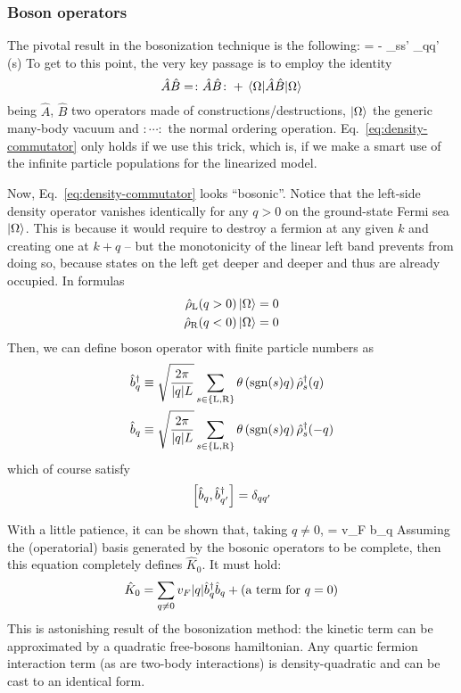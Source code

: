 \subsubsection*{Boson operators}

The pivotal result in the bosonization technique is the following:
\beq\label{eq:density-commutator}
	 = - \delta_{ss'} \delta_{qq'} \sgn(s) 
\eeq
To get to this point, the very key passage is to employ the identity
\[
	\hat A \hat B = \colon \hat A \hat B \colon + \mel{\Omega}{\hat A \hat B}{\Omega}
\]
being $\hat A$, $\hat B$ two operators made of constructions/destructions, $\ket{\Omega}$ the generic many-body vacuum and $\colon \cdots \colon$ the normal ordering operation. Eq.~\eqref{eq:density-commutator} only holds if we use this trick, which is, if we make a smart use of the infinite particle populations for the linearized model.

Now, Eq.~\eqref{eq:density-commutator} looks ``bosonic''. Notice that the left-side density operator vanishes identically for any $q>0$ on the ground-state Fermi sea $\ket{\Omega}$. This is because it would require to destroy a fermion at any given $k$ and creating one at $k+q$ -- but the monotonicity of the linear left band prevents from doing so, because states on the left get deeper and deeper and thus are already occupied. In formulas
\[
\begin{aligned}
	\hat \rho_\mathrm{L} (q>0) \ket{\Omega} &= 0 \\
	\hat \rho_\mathrm{R} (q<0) \ket{\Omega} &= 0
\end{aligned}
\]
Then, we can define boson operator with finite particle numbers as
\[
\begin{aligned}
	\hat b_q^\dagger &\equiv \sqrt{\frac{2\pi}{\abs{q}L}} \sum_{s \in \left\{\mathrm L, \mathrm R\right\}} \theta \left(\mathrm{sgn}(s) q\right) \hat \rho_s^\dagger (q) \\
	\hat b_q &\equiv \sqrt{\frac{2\pi}{\abs{q}L}} \sum_{s \in \left\{\mathrm L, \mathrm R\right\}} \theta \left(\mathrm{sgn}(s) q\right) \hat \rho_s^\dagger (-q)
\end{aligned}
\]
which of course satisfy
\[
	\comm{\hat b_q}{\hat b_{q'}^\dagger} = \delta_{qq'}
\]

With a little patience, it can be shown that, taking $q \neq 0$,
\beq\label{eq:boson-hamiltonian-commutator}
	 = v_F  \hat b_q
\eeq
Assuming the (operatorial) basis generated by the bosonic operators to be complete, then this equation completely defines $\hat K_0$. It must hold:
\[
	\hat K_0 = \sum_{q \neq 0} v_F \abs{q} \hat b_q^\dagger \hat b_q + (\text{a term for $q=0$})
\]
This is astonishing result of the bosonization method: the kinetic term can be approximated by a quadratic free-bosons hamiltonian. Any quartic fermion interaction term (as are two-body interactions) is density-quadratic and can be cast to an identical form.

